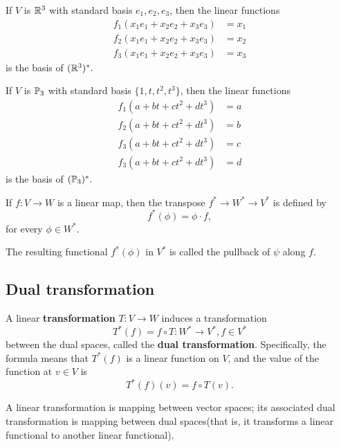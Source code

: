 \begin{refsection}
\begin{example}
If $V$ is $\mathbb{R}^3$ with standard basis $e_1,e_2,e_3$, then the linear functions
\begin{align*}
f_1(x_1e_1+x_2e_2+x_3e_3) &= x_1\\
f_2(x_1e_1+x_2e_2+x_3e_3) &= x_2\\
f_3(x_1e_1+x_2e_2+x_3e_3) &= x_3
\end{align*}	
is the basis of $(\mathbb{R}^3)^*.$
\end{example}

\begin{example}
	If $V$ is $\mathbb{P}_3$ with standard basis $\{1,t,t^2,t^3\}$, then the linear functions
	\begin{align*}
	f_1(a + bt + ct^2 + dt^3) &= a\\
	f_2(a + bt + ct^2 + dt^3) &= b\\
	f_3(a + bt + ct^2 + dt^3) &= c\\
	f_3(a + bt + ct^2 + dt^3) &= d
	\end{align*}	
	is the basis of $(\mathbb{P}_3)^*.$
\end{example}


\begin{definition}
If $f:V\to W$ is a linear map, then the transpose $f^*\to W^*\to V^*$ is defined by
$$f^*(\phi) = \phi\cdot f,$$
for every $\phi\in W^*.$

The resulting functional $f^*(\phi)$ in $V^*$ is called the pullback of $\psi$ along $f$.	
\end{definition}

\subsection{Dual transformation}

\begin{definition}
A linear\textbf{ transformation} $T:V\to W$ induces a transformation
$$T^*(f)= f\circ T: W^*\to V^*, f\in V^*$$
between the dual spaces, called the \textbf{dual transformation}. 
Specifically, the formula means that $T^*(f)$ is a linear function on $V$, and the value of the function at $v\in V$ is
$$T^*(f)(v) = f\circ T(v).$$
\end{definition}

\begin{remark}
A linear transformation is mapping between vector spaces; its associated dual transformation is mapping between dual spaces(that is, it transforms a linear functional to another linear functional).	
\end{remark}


\end{refsection}
